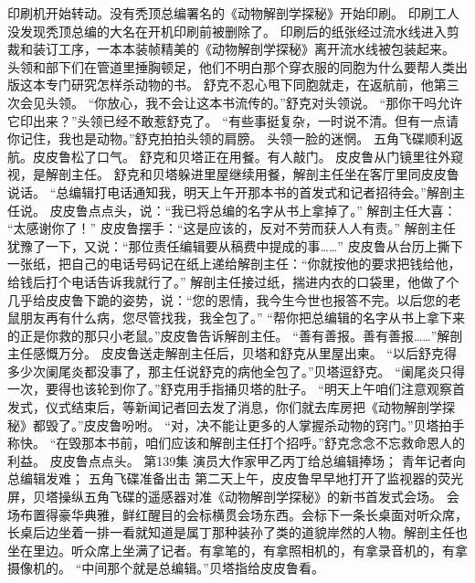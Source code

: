 \documentclass[a4paper,12pt,UTF8,twoside]{ctexbook}
\begin{document}
        印刷机开始转动。没有秃顶总编署名的《动物解剖学探秘》开始印刷。 
        印刷工人没发现秃顶总编的大名在开机印刷前被删除了。 
        印刷后的纸张经过流水线进入剪裁和装订工序，一本本装帧精美的《动物解剖学探秘》离开流水线被包装起来。 
        头领和部下们在管道里捶胸顿足，他们不明白那个穿衣服的同胞为什么要帮人类出版这本专门研究怎样杀动物的书。 
        舒克不忍心甩下同胞就走，在返航前，他第三次会见头领。 
        “你放心，我不会让这本书流传的。”舒克对头领说。 
        “那你干吗允许它印出来？”头领已经不敢惹舒克了。 
        “有些事挺复杂，一时说不清。但有一点请你记住，我也是动物。”舒克拍拍头领的肩膀。 
        头领一脸的迷惘。 
        五角飞碟顺利返航。皮皮鲁松了口气。 
        舒克和贝塔正在用餐。有人敲门。 
        皮皮鲁从门镜里往外窥视，是解剖主任。 
        舒克和贝塔躲进里屋继续用餐，解剖主任坐在客厅里同皮皮鲁说话。 
        “总编辑打电话通知我，明天上午开那本书的首发式和记者招待会。”解剖主任说。 
        皮皮鲁点点头，说：“我已将总编的名字从书上拿掉了。” 
        解剖主任大喜：  “太感谢你了！” 
        皮皮鲁摆手：“这是应该的，反对不劳而获人人有责。” 
        解剖主任犹豫了一下，又说：“那位责任编辑要从稿费中提成的事……” 
        皮皮鲁从台历上撕下一张纸，把自己的电话号码记在纸上递给解剖主任：“你就按他的要求把钱给他，给钱后打个电话告诉我就行了。” 
        解剖主任接过纸，揣进内衣的口袋里，他做了个几乎给皮皮鲁下跪的姿势，说：“您的恩情，我今生今世也报答不完。以后您的老鼠朋友再有什么病，您尽管找我，我全包了。” 
        “帮你把总编辑的名字从书上拿下来的正是你救的那只小老鼠。”皮皮鲁告诉解剖主任。 
        “善有善报。善有善报……”解剖主任感慨万分。 
        皮皮鲁送走解剖主任后，贝塔和舒克从里屋出柬。 
        “以后舒克得多少次阑尾炎都没事了，那主任说舒克的病他全包了。”贝塔逗舒克。 
        “阑尾炎只得一次，要得也该轮到你了。”舒克用手指捅贝塔的肚子。 
        “明天上午咱们注意观察首发式，仪式结束后，等新闻记者回去发了消息，你们就去库房把《动物解剖学探秘》都毁了。”皮皮鲁吩咐。 
        “对，决不能让更多的人掌握杀动物的窍门。”贝塔拍手称快。 
        “在毁那本书前，咱们应该和解剖主任打个招呼。”舒克念念不忘救命恩人的利益。 
        皮皮鲁点点头。   第139集 
        演员大作家甲乙丙丁给总编辑捧场； 
        青年记者向总编辑发难； 
        五角飞碟准备出击   
        第二天上午，皮皮鲁早早地打开了监视器的荧光屏，贝塔操纵五角飞碟的遥感器对准《动物解剖学探秘》的新书首发式会场。 
        会场布置得豪华典雅，鲜红醒目的会标横贯会场东西。会标下一条长桌面对听众席，长桌后边坐着一排一看就知道是属丁那种装孙了类的道貌岸然的人物。解剖主任也坐在里边。听众席上坐满了记者。有拿笔的，有拿照相机的，有拿录音机的，有拿摄像机的。 
        “中间那个就是总编辑。”贝塔指给皮皮鲁看。 
\end{document}
